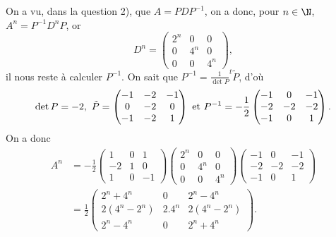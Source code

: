 {\begin{enumerate}
{On a vu, dans la question 2), que $A=PDP^{-1}$, on a donc, pour $n\in\N$, $A^n=P^{-1}D^nP$, or
$$D^n=\begin{pmatrix}2^n&0&0 \\ 0&4^n&0 \\  0&0&4^n\end{pmatrix},$$
il nous reste \`a calculer $P^{-1}$. On sait que $P^{-1}={\frac{1}{\det P}}^t\!\!\tilde P$, d'o\`u
$$\det P=-2,\ \tilde P=\begin{pmatrix}-1&-2&-1 \\ 0&-2&0 \\  -1&-2&1\end{pmatrix}\ {\hbox{et}}\ 
P^{-1}=-{\frac{1}{2}}\begin{pmatrix}-1&0&-1 \\ -2&-2&-2 \\  -1&0&1\end{pmatrix}.$$
On a donc
\begin{align*}A^n&=-{\frac{1}{2}}\begin{pmatrix}1&0&1 \\ -2&1&0 \\  1&0&-1\end{pmatrix}\begin{pmatrix}2^n&0&0 \\ 0&4^n&0 \\  0&0&4^n\end{pmatrix}\begin{pmatrix}-1&0&-1 \\ -2&-2&-2 \\  -1&0&1\end{pmatrix} \\ &={\frac{1}{2}}
\begin{pmatrix}2^n+4^n&0&2^n-4^n \\ 2(4^n-2^n)&2.4^n&2(4^n-2^n) \\  2^n-4^n&0&2^n+4^n\end{pmatrix}.
\end{align*}}
\end{enumerate}
}
